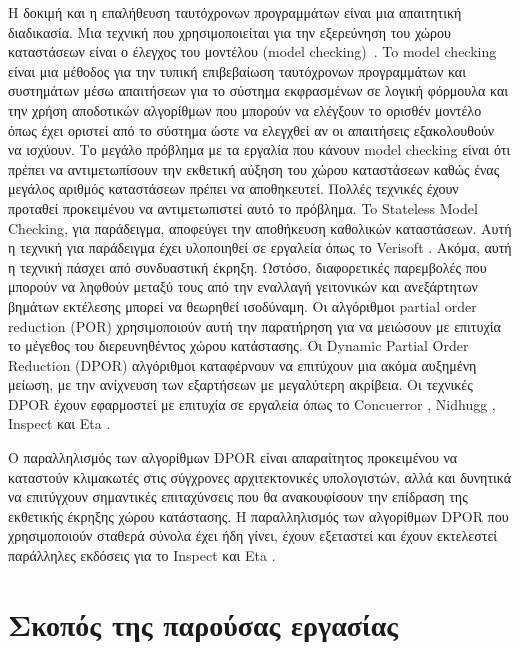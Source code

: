 Η δοκιμή και η επαλήθευση ταυτόχρονων προγραμμάτων είναι μια απαιτητική διαδικασία. Μια τεχνική που χρησιμοποιείται για
την εξερεύνηση του χώρου καταστάσεων είναι ο έλεγχος του μοντέλου (model checking)~\cite{WikipediaModelChecking}. To
model checking είναι μια μέθοδος για την τυπική επιβεβαίωση ταυτόχρονων προγραμμάτων και συστημάτων μέσω απαιτήσεων για
το σύστημα εκφρασμένων σε λογική φόρμουλα και την χρήση αποδοτικών αλγορίθμων που μπορούν να ελέγξουν το ορισθέν μοντέλο
όπως έχει οριστεί από το σύστημα ώστε να ελεγχθεί αν οι απαιτήσεις εξακολουθούν να ισχύουν. Το μεγάλο πρόβλημα με τα
εργαλία που κάνουν model checking είναι ότι πρέπει να αντιμετωπίσουν την εκθετική αύξηση του χώρου καταστάσεων καθώς
ένας μεγάλος αριθμός καταστάσεων πρέπει να αποθηκευτεί. Πολλές τεχνικές έχουν προταθεί προκειμένου να αντιμετωπιστεί
αυτό το πρόβλημα. To Stateless Model Checking, για παράδειγμα, αποφεύγει την αποθήκευση καθολικών καταστάσεων. Αυτή η
τεχνική για παράδειγμα έχει υλοποιηθεί σε εργαλεία όπως το Verisoft \cite{Godefroid:2005:SMC:1084665.1084674}.
Ακόμα, αυτή η τεχνική πάσχει από συνδυαστική έκρηξη. Ωστόσο, διαφορετικές παρεμβολές που μπορούν να ληφθούν μεταξύ τους από την
 εναλλαγή γειτονικών και ανεξάρτητων βημάτων εκτέλεσης μπορεί να θεωρηθεί ισοδύναμη.
Οι αλγόριθμοι \cite{Godefroid1996, POR, 10.1007/3-540-53863-1_36} partial order reduction (POR) χρησιμοποιούν αυτή την παρατήρηση για να μειώσουν με επιτυχία
το μέγεθος του διερευνηθέντος χώρου κατάστασης. Οι Dynamic Partial Order Reduction
(DPOR) αλγόριθμοι \cite{FlanaganDPOR, AbdullaAronisJohnssonSagonasDPOR2014} καταφέρνουν να επιτύχουν μια ακόμα αυξημένη μείωση,
με την ανίχνευση των εξαρτήσεων με μεγαλύτερη ακρίβεια. Οι τεχνικές DPOR έχουν εφαρμοστεί με επιτυχία σε εργαλεία όπως το Concuerror
\cite{6569727, Gotovos:2011:TDC:2034654.2034664}, Nidhugg \cite{Abdulla:2015:SMC:2945565.2945622}, Inspect \cite{Yang:2007:DDP:1770532.1770541}
και Eta \cite{simsa2011efficient}.

Ο παραλληλισμός των αλγορίθμων DPOR είναι απαραίτητος προκειμένου να καταστούν κλιμακωτές στις σύγχρονες αρχιτεκτονικές υπολογιστών, αλλά και δυνητικά
να επιτύγχουν σημαντικές επιταχύνσεις που θα ανακουφίσουν την επίδραση της εκθετικής έκρηξης χώρου κατάστασης. Η παραλληλισμός των αλγορίθμων DPOR που χρησιμοποιούν σταθερά σύνολα \cite{FlanaganDPOR, Lei:2006:RTC:1248722.1248743, 10.1007/3-540-53863-1_36} έχει ήδη γίνει,
έχουν εξεταστεί και έχουν εκτελεστεί παράλληλες εκδόσεις για το Inspect \cite{yang2008inspect} και Eta
\cite{Simsa2012ScalableDP}.

\section{Σκοπός της παρούσας εργασίας}

